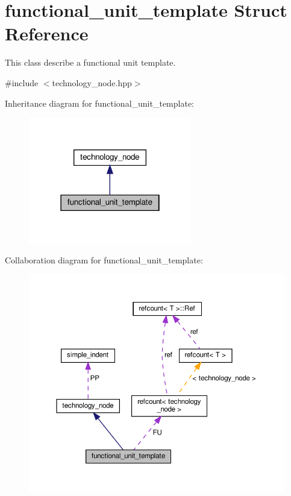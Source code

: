 \hypertarget{structfunctional__unit__template}{}\section{functional\+\_\+unit\+\_\+template Struct Reference}
\label{structfunctional__unit__template}


This class describe a functional unit template.  




{\ttfamily \#include $<$technology\+\_\+node.\+hpp$>$}



Inheritance diagram for functional\+\_\+unit\+\_\+template\+:
\nopagebreak
\begin{figure}[H]
\begin{center}
\leavevmode
\includegraphics[width=202pt]{df/d8c/structfunctional__unit__template__inherit__graph}
\end{center}
\end{figure}


Collaboration diagram for functional\+\_\+unit\+\_\+template\+:
\nopagebreak
\begin{figure}[H]
\begin{center}
\leavevmode
\includegraphics[width=350pt]{de/dd2/structfunctional__unit__template__coll__graph}
\end{center}
\end{figure}
